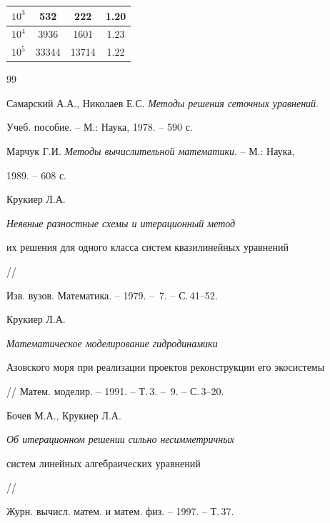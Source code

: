 \begin{center}
\begin{tabular}{|c|c|c|c|}
\hline


$10^3$ & 532 & 222 & 1.20 \\


\hline


$10^4$ & 3936 & 1601 & 1.23 \\


\hline


$10^5$ & 33344 & 13714 & 1.22 \\


\hline


\end{tabular} 


\end{center}





 


\begin{thebibliography}{99} 


 




Самарский А.А., Николаев Е.С. {\em Методы решения сеточных уравнений}. 


Учеб. пособие. -- М.: Наука, 1978. -- 590 с. 




Марчук Г.И. {\em Методы вычислительной математики}. -- М.: Наука, 


1989. -- 608 с. 




Крукиер Л.А. {\em Неявные разностные схемы и итерационный метод  


их решения для одного класса систем квазилинейных уравнений} //  


Изв. вузов. Математика. -- 1979. -- \No\,7. -- С.\,41--52. 




Крукиер Л.А. {\em Математическое моделирование гидродинамики  


Азовского моря при реализации проектов реконструкции его экосистемы} 


// Матем. моделир. -- 1991. -- Т.\,3. -- \No\,9. -- С.\,3--20. 




Бочев М.А., Крукиер Л.А. {\em Об итерационном решении сильно несимметричных 


систем линейных алгебраических уравнений} //  


Журн. вычисл. матем. и матем. физ. -- 1997. -- Т.\,37. 



\end{thebibliography}
